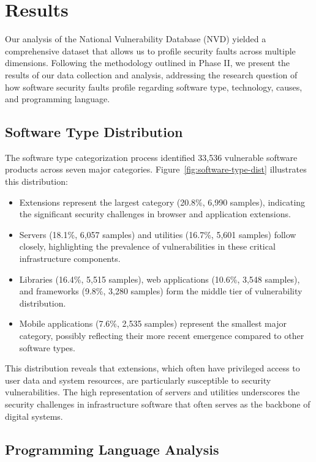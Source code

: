 \section{Results}

Our analysis of the National Vulnerability Database (NVD) yielded a comprehensive dataset that allows us to profile security faults across multiple dimensions. Following the methodology outlined in Phase II, we present the results of our data collection and analysis, addressing the research question of how software security faults profile regarding software type, technology, causes, and programming language.

\subsection{Software Type Distribution}

The software type categorization process identified 33,536 vulnerable software products across seven major categories. Figure~\ref{fig:software-type-dist} illustrates this distribution:

\begin{itemize}
    \item Extensions represent the largest category (20.8\%, 6,990 samples), indicating the significant security challenges in browser and application extensions.
    \item Servers (18.1\%, 6,057 samples) and utilities (16.7\%, 5,601 samples) follow closely, highlighting the prevalence of vulnerabilities in these critical infrastructure components.
    \item Libraries (16.4\%, 5,515 samples), web applications (10.6\%, 3,548 samples), and frameworks (9.8\%, 3,280 samples) form the middle tier of vulnerability distribution.
    \item Mobile applications (7.6\%, 2,535 samples) represent the smallest major category, possibly reflecting their more recent emergence compared to other software types.
\end{itemize}

This distribution reveals that extensions, which often have privileged access to user data and system resources, are particularly susceptible to security vulnerabilities. The high representation of servers and utilities underscores the security challenges in infrastructure software that often serves as the backbone of digital systems.

\subsection{Programming Language Analysis}

